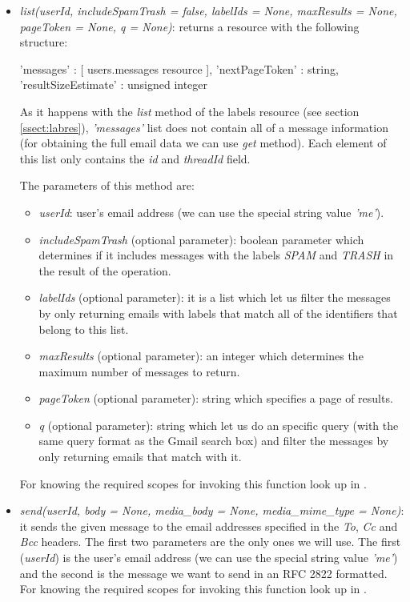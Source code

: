 \begin{itemize}
	\item\textit{list(userId, includeSpamTrash = false, labelIds = None, maxResults = None, pageToken = None, q = None)}: returns a resource with the following structure:
	\begin{python}
		{
		'messages' : [ users.messages resource ],
		'nextPageToken' : string,
		'resultSizeEstimate' : unsigned integer
		}
	\end{python}
	As it happens with the \textit{list} method of the labels resource (see section \ref{ssect:labres}), \textit{'messages'} list does not contain all of a message information (for obtaining the full email data we can use \textit{get} method). Each element of this list only contains the \textit{id} and \textit{threadId} field.
	
	The parameters of this method are:
	\begin{itemize}
		\item\textit{userId}: user's email address (we can use the special string value \textit{'me'}).
		\item\textit{includeSpamTrash} (optional parameter): boolean parameter which determines if it includes messages with the labels \textit{SPAM} and \textit{TRASH} in the result of the operation.
		\item\textit{labelIds} (optional parameter): it is a list which let us filter the messages by only returning emails with labels that match all of the identifiers that belong to this list.
		\item\textit{maxResults} (optional parameter): an integer which determines the maximum number of messages to return.
		\item\textit{pageToken} (optional parameter): string which specifies a page of results.
		\item\textit{q} (optional parameter): string which let us do an specific query (with the same query format as the Gmail search box) and filter the messages by only returning emails that match with it.
	\end{itemize}
	For knowing the required scopes for invoking this function look up in \cite[/v1/reference/users/messages/list]{gmailAPI}.
	\item\textit{send(userId, body = None, media\_body = None, media\_mime\_type = None)}: it sends the given message to the email addresses specified in the \textit{To}, \textit{Cc} and \textit{Bcc} headers. The first two parameters are the only ones we will use. The first (\textit{userId}) is the user's email address (we can use the special string value \textit{'me'}) and the second is the message we want to send in an RFC 2822 \citep{rfc2822} formatted. For knowing the required scopes for invoking this function look up in \cite[/v1/reference/users/messages/send]{gmailAPI}.
\end{itemize}

